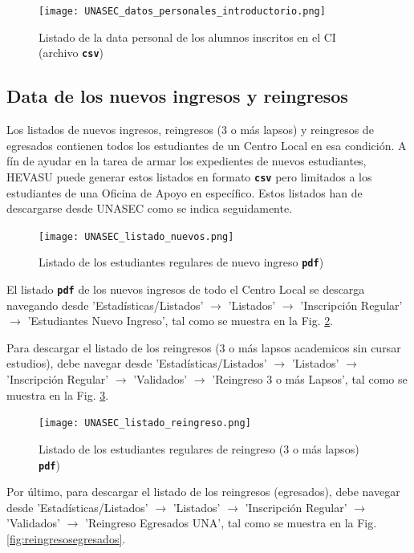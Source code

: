 \documentclass[letterpaper,12pt]{book}
\newcommand{\fileformat}[1]{\textbf{\texttt{#1}}}
\begin{document}
\begin{figure}[!ht]
  \centering
  \texttt{[image: UNASEC\_datos\_personales\_introductorio.png]}
  \caption{Listado de la data personal de los alumnos inscritos en el CI (archivo \fileformat{csv})}
  \label{fig:introductorio_csv}
\end{figure}

\subsection{Data de los nuevos ingresos y reingresos}

Los listados de nuevos ingresos, reingresos (3 o más lapsos) y reingresos de egresados contienen todos los estudiantes de un Centro Local en esa condición. A fín de ayudar en la tarea de armar los expedientes de nuevos estudiantes, HEVASU puede generar estos listados en formato \fileformat{csv} pero limitados a los estudiantes de una Oficina de Apoyo en específico.  Estos listados han de descargarse desde UNASEC como se indica seguidamente.

\begin{figure}[!h]
  \centering
  \texttt{[image: UNASEC\_listado\_nuevos.png]}
  \caption{Listado de los estudiantes regulares de nuevo ingreso \fileformat{pdf})}
  \label{fig:nuevoingreso}
\end{figure}

El listado \fileformat{pdf} de los nuevos ingresos de todo el Centro Local se descarga navegando desde 'Estadísticas/Listados' $\rightarrow$ 'Listados' $\rightarrow$ 'Inscripción Regular' $\rightarrow$ 'Estudiantes Nuevo Ingreso', tal como se muestra en la Fig. \ref{fig:nuevoingreso}.

Para descargar el listado de los reingresos (3 o más lapsos academicos sin cursar estudios), debe navegar desde 'Estadísticas/Listados' $\rightarrow$ 'Listados' $\rightarrow$ 'Inscripción Regular' $\rightarrow$ 'Validados' $\rightarrow$ 'Reingreso 3 o más Lapsos', tal como se muestra en la Fig. \ref{fig:reingresos3omas}.

\begin{figure}[!ht]
  \centering
  \texttt{[image: UNASEC\_listado\_reingreso.png]}
  \caption{Listado de los estudiantes regulares de reingreso (3 o más lapsos) \fileformat{pdf})}
  \label{fig:reingresos3omas}
\end{figure}

Por último, para descargar el listado de los reingresos (egresados), debe navegar desde 'Estadísticas/Listados' $\rightarrow$ 'Listados' $\rightarrow$ 'Inscripción Regular' $\rightarrow$ 'Validados' $\rightarrow$ 'Reingreso Egresados UNA', tal como se muestra en la Fig. \ref{fig:reingresosegresados}.
\end{document}
